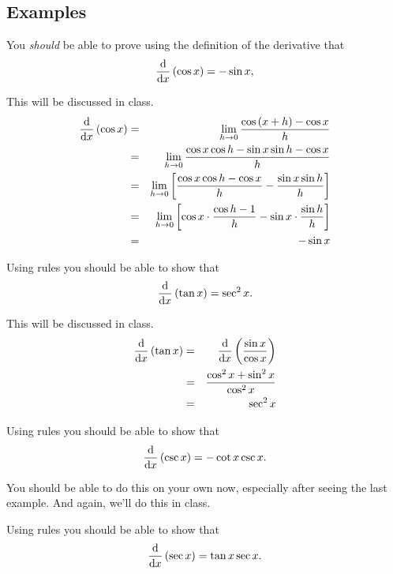 \documentclass[12pt,addpoints, answers, fleqn]{exam}
\begin{document}
\subsection{Examples}

\begin{questions}
\question You \emph{should} be able to prove using the definition of the derivative that
\[
\frac{{\rm{d}}}{{\rm{d}}x} \left( \cos x \right) = -\sin x,
\]

\begin{solution} This will be discussed in class.
\begin{eqnarray*}
\frac{{\rm{d}}}{{\rm{d}}x} \left( \cos x \right) &=& \mathop {\lim }\limits_{ h \to 0} \frac{\cos \left( x + h \right) - \cos x}{h}\\
&=& \mathop {\lim }\limits_{ h \to 0} \frac{\cos x \cos h - \sin x \sin h - \cos x}{h}\\
&=& \mathop {\lim }\limits_{ h \to 0} \left[\frac{\cos x \cos h - \cos x}{h} - \frac{\sin x \sin h}{h}\right]\\
&=& \mathop {\lim }\limits_{ h \to 0} \left[\cos x \cdot \frac{ \cos h - 1}{h} - \sin x \cdot \frac{\sin h }{h}\right]\\
&=& -\sin x
\end{eqnarray*}
\end{solution}

\question Using rules you should be able to show that
\[
\frac{{\rm{d}}}{{\rm{d}}x} \left( \tan x \right) = \sec^2 x.
\]

\begin{solution}
This will be discussed in class.
\begin{eqnarray*}
\frac{{\rm{d}}}{{\rm{d}}x} \left( \tan x \right) &=& \frac{{\rm{d}}}{{\rm{d}}x} \left( \frac{\sin x }{\cos x} \right)\\
&=& \frac{\cos^2 x + \sin^2 x}{\cos^2 x}\\
&=& \sec^2 x
\end{eqnarray*}
\end{solution}

\question Using rules you should be able to show that
\[
\frac{{\rm{d}}}{{\rm{d}}x} \left( \csc x \right) = -\cot x \csc x.
\]

\begin{solution}
You should be able to do this on your own now, especially after seeing the last example. And again, we'll do this in class.
\end{solution}

\question Using rules you should be able to show that
\[
\frac{{\rm{d}}}{{\rm{d}}x} \left( \sec x \right) = \tan x \sec x.
\]


\end{questions}
\end{document}
